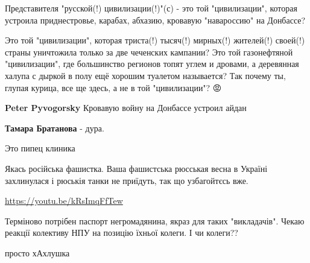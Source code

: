 \begin{itemize}
Представителя "русской(!) цивилизации(!)"(с) - это той "цивилизации", которая
устроила приднестровье, карабах, абхазию, кровавую "навароссию" на Донбассе?

Это той "цивилизации", которая триста(!) тысяч(!) мирных(!) жителей(!) своей(!)
страны уничтожила только за две чеченских кампании? Это той газонефтяной
"цивилизации", где большинство регионов топят углем и дровами, а деревянная
халупа с дыркой в полу ещё хорошим туалетом называется? Так почему ты, глупая
курица, все ще здесь, а не в той "цивилизации"? 😡

\begin{itemize}

\textbf{Peter Pyvogorsky} Кровавую войну на Донбассе устроил айдан


\textbf{Тамара Братанова} - дура.
\end{itemize}


Это пипец клиника


Якась російська фашистка. Ваша фашистська рюсськая весна в Україні захлинулася
і рюськія танки не приїдуть, так що узбагойтєсь вже.


\url{https://youtu.be/kRsImqFfTew}


Терміново потрібен паспорт негромадянина, якраз для таких "викладачів". Чекаю реакції колективу НПУ на позицію їхньої колеги. І чи колеги??


просто хАхлушка


\end{itemize}
